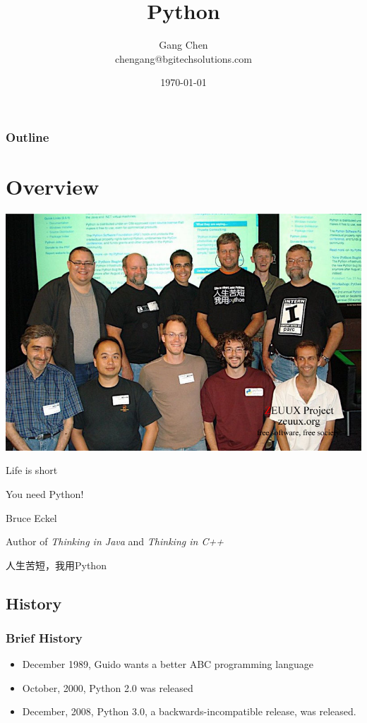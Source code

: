 \documentclass[UTF8]{beamer}
\title{Python}
\author{Gang Chen\\ chengang@bgitechsolutions.com}
\date{\today}
\begin{document}
\begin{frame}
\titlepage
\end{frame}

\begin{frame}[t]\frametitle{Outline}
\tableofcontents[hideallsubsections]
\end{frame}

\section{Overview}

\begin{frame}
  \centerline{\includegraphics[height=\textheight]{guido.jpg}}
\end{frame}

\begin{frame}
  \centerline{\huge{Life is short}}
  \vspace{1cm}
  \centerline{\huge{You need Python!}}
  \vspace{1cm}
  \centerline{Bruce Eckel}
  \centerline{Author of \textit{Thinking in Java} and \textit{Thinking in C++}}
  \vspace{1.5cm}
  \centerline{\huge{人生苦短，我用Python}}
\end{frame}

\subsection{History}

\begin{frame}
  \frametitle{Brief History}
  \begin{itemize}
    \item December 1989, Guido wants a better ABC programming language
    \item October, 2000, Python 2.0 was released
    \item December, 2008, Python 3.0, a backwards-incompatible release, was
    released.
  \end{itemize}
\end{frame}
\end{document}
